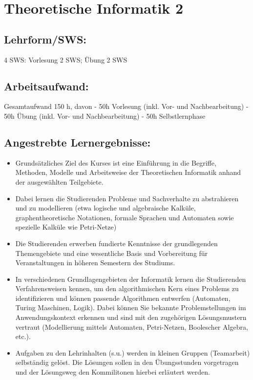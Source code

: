\chapter{Theoretische Informatik 2}\label{theoretische-informatik-2}

\section{Lehrform/SWS:}\label{lehrformsws-28}

4 SWS: Vorlesung 2 SWS; Übung 2 SWS

\section{Arbeitsaufwand:}\label{arbeitsaufwand-27}

Gesamtaufwand 150 h, davon - 50h Vorlesung (inkl. Vor- und
Nachbearbeitung) - 50h Übung (inkl. Vor- und Nachbearbeitung) - 50h
Selbstlernphase

\section{Angestrebte
Lernergebnisse:}\label{angestrebte-lernergebnisse-28}

\begin{itemize}
\item
  Grundsätzliches Ziel des Kurses ist eine Einführung in die Begriffe,
  Methoden, Modelle und Arbeitsweise der Theoretischen Informatik anhand
  der ausgewählten Teilgebiete.
\item
  Dabei lernen die Studierenden Probleme und Sachverhalte zu
  abstrahieren und zu modellieren (etwa logische und algebraische
  Kalküle, graphentheoretische Notationen, formale Sprachen und
  Automaten sowie spezielle Kalküle wie Petri-Netze)
\item
  Die Studierenden erwerben fundierte Kenntnisse der grundlegenden
  Themengebiete und eine wesentliche Basis und Vorbereitung für
  Veranstaltungen in höheren Semestern des Studiums.
\item
  In verschiedenen Grundlagengebieten der Informatik lernen die
  Studierenden Verfahrensweisen kennen, um den algorithmischen Kern
  eines Problems zu identifizieren und können passende Algorithmen
  entwerfen (Automaten, Turing Maschinen, Logik). Dabei können Sie
  bekannte Problemstellungen im Anwendungskontext erkennen und sind mit
  den zugehörigen Lösungsmustern vertraut (Modellierung mittels
  Automaten, Petri-Netzen, Boolescher Algebra, etc.).
\item
  Aufgaben zu den Lehrinhalten (s.u.) werden in kleinen Gruppen
  (Teamarbeit) selbständig gelöst. Die Lösungen sollen in den
  Übungsstunden vorgetragen und der Lösungsweg den Kommilitonen hierbei
  erläutert werden.
\end{itemize}

